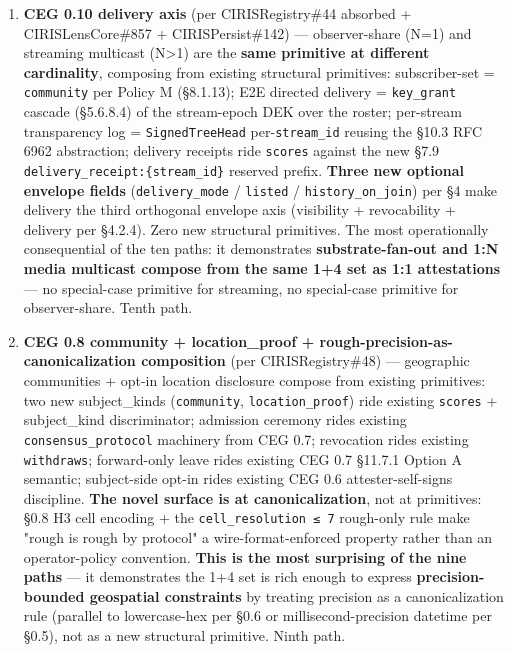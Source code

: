 \documentclass[10pt]{article}
\begin{document}
\begin{enumerate}
\item \textbf{CEG 0.10 delivery axis} (per CIRISRegistry\#44 absorbed + CIRISLensCore\#857 + CIRISPersist\#142) — observer-share (N=1) and streaming multicast (N>1) are the \textbf{same primitive at different cardinality}, composing from existing structural primitives: subscriber-set = \texttt{community} per Policy M (§8.1.13); E2E directed delivery = \texttt{key\_grant} cascade (§5.6.8.4) of the stream-epoch DEK over the roster; per-stream transparency log = \texttt{SignedTreeHead} per-\texttt{stream\_id} reusing the §10.3 RFC 6962 abstraction; delivery receipts ride \texttt{scores} against the new §7.9 \texttt{delivery\_receipt:\{stream\_id\}} reserved prefix. \textbf{Three new optional envelope fields} (\texttt{delivery\_mode} / \texttt{listed} / \texttt{history\_on\_join}) per §4 make delivery the third orthogonal envelope axis (visibility + revocability + delivery per §4.2.4). Zero new structural primitives. The most operationally consequential of the ten paths: it demonstrates \textbf{substrate-fan-out and 1:N media multicast compose from the same 1+4 set as 1:1 attestations} — no special-case primitive for streaming, no special-case primitive for observer-share. Tenth path.
\item \textbf{CEG 0.8 community + location\_proof + rough-precision-as-canonicalization composition} (per CIRISRegistry\#48) — geographic communities + opt-in location disclosure compose from existing primitives: two new subject\_kinds (\texttt{community}, \texttt{location\_proof}) ride existing \texttt{scores} + subject\_kind discriminator; admission ceremony rides existing \texttt{consensus\_protocol} machinery from CEG 0.7; revocation rides existing \texttt{withdraws}; forward-only leave rides existing CEG 0.7 §11.7.1 Option A semantic; subject-side opt-in rides existing CEG 0.6 attester-self-signs discipline. \textbf{The novel surface is at canonicalization}, not at primitives: §0.8 H3 cell encoding + the \texttt{cell\_resolution ≤ 7} rough-only rule make "rough is rough by protocol" a wire-format-enforced property rather than an operator-policy convention. \textbf{This is the most surprising of the nine paths} — it demonstrates the 1+4 set is rich enough to express \textbf{precision-bounded geospatial constraints} by treating precision as a canonicalization rule (parallel to lowercase-hex per §0.6 or millisecond-precision datetime per §0.5), not as a new structural primitive. Ninth path.

\end{enumerate}
\end{document}
